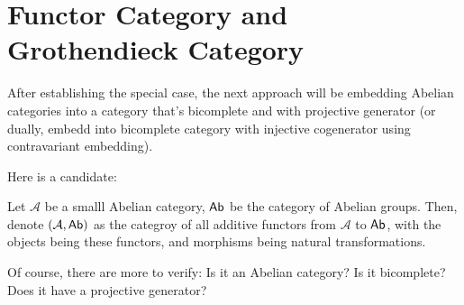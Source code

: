 \documentclass{article}
\begin{document}
\newpage

\section{Functor Category and Grothendieck Category}

After establishing the special case, the next approach will be embedding Abelian categories into a category that's bicomplete and with projective generator (or dually, embedd into bicomplete category with injective cogenerator using contravariant embedding).

\hfil

Here is a candidate:
\begin{defn}
    Let $\mathcal{A}$ be a smalll Abelian category, $\mathsf{Ab}$ be the category of Abelian groups. Then, denote $(\mathcal{A},\mathsf{Ab})$ as the categroy of all additive functors from $\mathcal{A}$ to $\mathsf{Ab}$, with the objects being these functors, and morphisms being natural transformations.
\end{defn}
Of course, there are more to verify: Is it an Abelian category? Is it bicomplete? Does it have a projective generator?
\end{document}
